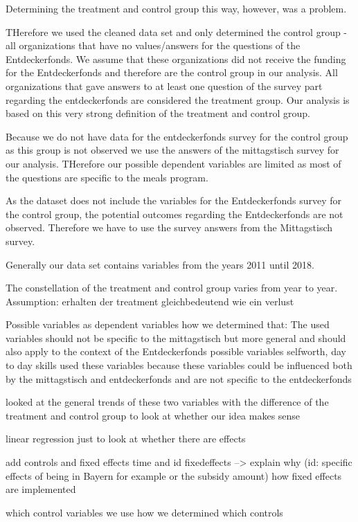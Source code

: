 \documentclass[12pt, a4paper, titlepage]{article}\usepackage[]{graphicx}\usepackage[]{color}
\begin{document}
Determining the treatment and control group this way, however, was a problem.

THerefore we used the cleaned data set and only determined the control group - all organizations that have no values/answers for the questions of the Entdeckerfonds. We assume that these organizations did not receive the funding for the Entdeckerfonds and therefore are the control group in our analysis. All organizations that gave answers to at least one question of the survey part regarding the entdeckerfonds are considered the treatment group. 
Our analysis is based on this very strong definition of the treatment and control group.

Because we do not have data for the entdeckerfonds survey for the control group as this group is not observed we use the answers of the mittagstisch survey for our analysis. THerefore our possible dependent variables are limited as most of the questions are specific to the meals program. 

As the dataset does not include the variables for the Entdeckerfonds survey for the control group, the potential outcomes regarding the Entdeckerfonds are not observed. Therefore we have to use the survey answers from the Mittagstisch survey.

Generally our data set contains variables from the years 2011 until 2018. 

The constellation of the treatment and control group varies from year to year. 
Assumption: erhalten der treatment gleichbedeutend wie ein verlust

Possible variables as dependent variables
how we determined that:
The used variables should not be specific to the mittagstisch but more general and should also apply to the context of the Entdeckerfonds
possible variables selfworth, day to day skills
used these variables because these variables could be influenced both by the mittagstisch and entdeckerfonds and are not specific to the entdeckerfonds

looked at the general trends of these two variables with the difference of the treatment and control group to look at whether our idea makes sense

linear regression just to look at whether there are effects

add controls and fixed effects time and id fixedeffects --> explain why (id: specific effects of being in Bayern for example or the subsidy amount)
how fixed effects are implemented

which control variables we use
how we determined which controls
\end{document}

